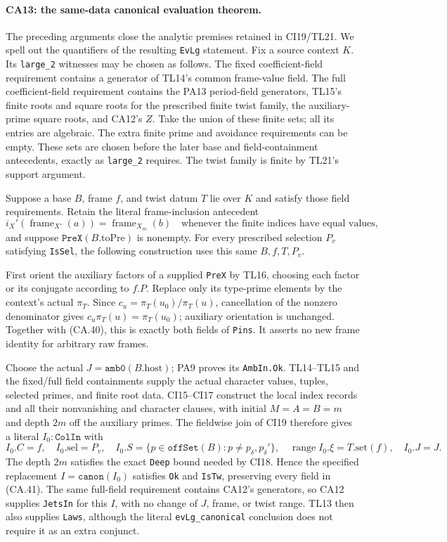 \paragraph{CA13: the same-data canonical evaluation theorem.}
The preceding arguments close the analytic premises retained in
CI19/TL21. We spell out the quantifiers of the resulting
\texttt{EvLg} statement. Fix a source context $K$. Its
\texttt{large\_2} witnesses may be chosen as follows.
The fixed coefficient-field requirement contains a generator
of TL14's common frame-value field. The full coefficient-field
requirement contains the PA13 period-field generators, TL15's
finite roots and square roots for the prescribed finite twist
family, the auxiliary-prime square roots, and CA12's $Z$.
Take the union of these finite sets; all its entries are
algebraic. The extra finite prime and avoidance requirements
can be empty. These sets are chosen before the later base and
field-containment antecedents, exactly as \texttt{large\_2}
requires. The twist family is finite by TL21's support argument.

Suppose a base $B$, frame $f$, and twist datum $T$ lie over
$K$ and satisfy those field requirements. Retain the literal
frame-inclusion antecedent
\[
 i_X'(\operatorname{frame}_{X'}(a))
       =\operatorname{frame}_{X_m}(b)
       \quad\text{whenever the finite indices have equal values},
 \tag{CA.40}
\]
and suppose $\texttt{PreX}(B.\mathrm{toPre})$ is nonempty.
For every prescribed selection $P_v$ satisfying \texttt{IsSel},
the following construction uses this same $B,f,T,P_v$.

First orient the auxiliary factors of a supplied \texttt{PreX}
by TL16, choosing each factor or its conjugate according to
$f.P$. Replace only its type-prime elements by the context's
actual $\pi_T$. Since $c_u=\pi_T(u_0)/\pi_T(u)$, cancellation
of the nonzero denominator gives
$c_u\pi_T(u)=\pi_T(u_0)$; auxiliary orientation is unchanged.
Together with (CA.40), this is exactly both fields of
\texttt{Pins}. It asserts no new frame identity for arbitrary
raw frames.

Choose the actual $J=\texttt{amb0}(B.\mathrm{host})$;
PA9 proves its \texttt{AmbIn.Ok}. TL14--TL15 and the fixed/full
field containments supply the actual character values, tuples,
selected primes, and finite root data. CI15--CI17 construct
the local index records and all their nonvanishing and character
clauses, with initial $M=A=B=m$ and depth $2m$ off the auxiliary
primes. The fieldwise join of CI19 therefore gives a literal
$I_0:\texttt{ColIn}$ with
\[
 I_0.C=f,\quad I_0.\mathrm{sel}=P_v,\quad
 I_0.S=\{p\in\texttt{offSet}(B):p\ne p_\delta,p_\delta'\},
 \quad\operatorname{range}I_0.\xi=T.\mathrm{set}(f),\quad I_0.J=J.
 \tag{CA.41}
\]
The depth $2m$ satisfies the exact \texttt{Deep} bound needed
by CI18. Hence the specified replacement
$I=\texttt{canon}(I_0)$ satisfies \texttt{Ok} and
\texttt{IsTw}, preserving every field in (CA.41).
The same full-field requirement contains CA12's generators,
so CA12 supplies \texttt{JetsIn} for this $I$, with no change
of $J$, frame, or twist range. TL13 then also supplies
\texttt{Laws}, although the literal \texttt{evLg\_canonical}
conclusion does not require it as an extra conjunct.

